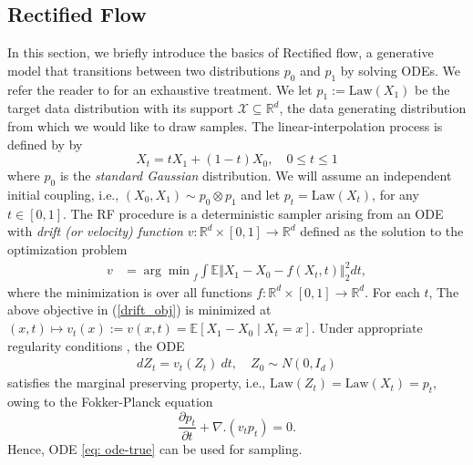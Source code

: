 \documentclass{article}
\theoremstyle{plain}
\theoremstyle{definition}
\theoremstyle{remark}
\def\argmin{{\arg\min}}
\def\bbE{\mathbb{E}}
\def\bbR{\mathbb{R}}
\def\cX{\mathcal{X}}
\def\cZ{\mathcal{Z}}
\def\Norm#1{\Vert#1\Vert}
\newcommand{\bc}[1]{\left\{{#1}\right\}}
\newcommand{\br}[1]{\left({#1}\right)}
\newcommand{\Law}{\text{Law}}
\newcommand{\Rectify}[1]{\texttt{Rectify}\br{#1}}
\newcommand{\Rectflow}[1]{\texttt{Rectflow}\br{#1}}
\begin{document}
\subsection{Rectified Flow}
\label{sec: Rf}
In this section, we briefly introduce the basics of Rectified flow, a generative model that transitions between two distributions $p_0$ and $p_1$ by solving ODEs. We refer the reader to \citet{Liu2024_FlowNotes,liu2022rectified} for an exhaustive treatment.  
We let $p_1 := \Law(X_1)$ be the target data distribution with its support $\cX \subseteq \bbR^d$, the data generating distribution from which we would like to draw samples. The linear-interpolation process is defined by by
\begin{equation}
\label{eq: RF linear process}
X_t = t X_1 + (1-t) X_0, \quad 0\leq t \leq 1
\end{equation}
where $p_0$ is the \textit{standard Gaussian} distribution. We will assume an independent initial coupling,  i.e., $(X_0, X_1) \sim p_0 \otimes p_1$ and let  $p_t = \Law(X_t)$, for any $t \in [0,1]$.
The RF procedure is a deterministic sampler arising from an ODE with {\it drift (or velocity) function} $v:\bbR^d \times [0, 1] \rightarrow \bbR^d$ defined as the solution to the optimization problem 
\begin{align}
    v &= \argmin_{f} \int \bbE{\Norm{X_1 - X_0 - f(X_t, t)}_2^2} dt , \label{drift_obj}
\end{align}
where the minimization is over all functions $f:\bbR^d \times [0, 1] \rightarrow \bbR^d$. 
For each $t$, The above objective in (\ref{drift_obj}) is minimized at
$
 (x,t) \mapsto   v_t(x) := v(x, t) = \bbE[X_1-X_0 \mid X_t = x]. 
$
 Under appropriate regularity conditions \citep[investigated in][]{bansal2025wasserstein, mena2025statisticalpropertiesrectifiedflow}, the ODE
\begin{align}
    dZ_t = v_t(Z_t)\ dt, \quad Z_0 \sim N(0, I_d) \label{eq: ode-true}
\end{align}
 satisfies the marginal preserving property,
 i.e., $\Law(Z_t) = \Law(X_t) = p_t$, owing to the Fokker-Planck equation
 \begin{equation}
     \label{eq: RF-FP}
     \frac{\partial p_t}{\partial t} + \nabla. (v_t p_t) = 0.
 \end{equation}
 Hence, ODE \eqref{eq: ode-true} can be used for sampling. 
\end{document}
